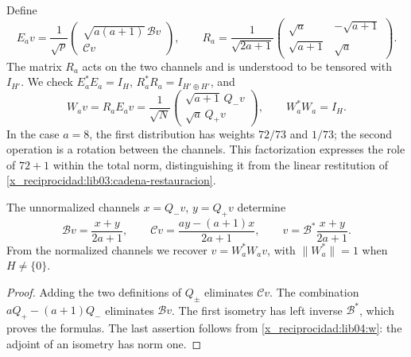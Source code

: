 Define
\begin{equation}
 E_av=\frac1{\sqrt p}
 \begin{pmatrix}\sqrt{a(a+1)}\,\mathcal Bv\\\mathcal Cv\end{pmatrix},
 \qquad
 R_a=\frac1{\sqrt{2a+1}}
 \begin{pmatrix}\sqrt a&-\sqrt{a+1}\\
                 \sqrt{a+1}&\sqrt a\end{pmatrix}.
 \label{x_reciprocidad:lib04:factorizacion-er}
\end{equation}
The matrix \(R_a\) acts on the two channels and is understood to be tensored
with \(I_{H'}\). We check
\(E_a^*E_a=I_H\), \(R_a^*R_a=I_{H'\oplus H'}\), and
\begin{equation}
 W_av=R_aE_av
 =\frac1{\sqrt N}
 \begin{pmatrix}\sqrt{a+1}\,Q_-v\\\sqrt a\,Q_+v\end{pmatrix},
 \qquad W_a^*W_a=I_H.
 \label{x_reciprocidad:lib04:w}
\end{equation}
In the case \(a=8\), the first distribution has weights \(72/73\) and
\(1/73\); the second operation is a rotation between the channels.
This factorization expresses the role of \(72+1\) within the total
norm, distinguishing it from the linear restitution of
\eqref{x_reciprocidad:lib03:cadena-restauracion}.

\begin{proposition}
\label{x_reciprocidad:lib04:prop-recuperacion}
The unnormalized channels \(x=Q_-v\), \(y=Q_+v\) determine
\begin{equation}
 \mathcal Bv=\frac{x+y}{2a+1},\qquad
 \mathcal Cv=\frac{ay-(a+1)x}{2a+1},\qquad
 v=\mathcal B^*\frac{x+y}{2a+1}.
 \label{x_reciprocidad:lib04:inversa-canales}
\end{equation}
From the normalized channels we recover
\(v=W_a^*W_av\), with \(\|W_a^*\|=1\) when \(H\neq\{0\}\).
\end{proposition}

\begin{proof}
Adding the two definitions of \(Q_\pm\) eliminates \(\mathcal Cv\).
The combination \(aQ_+-(a+1)Q_-\) eliminates \(\mathcal Bv\).
The first isometry has left inverse \(\mathcal B^*\), which
proves the formulas. The last assertion follows from
\eqref{x_reciprocidad:lib04:w}: the adjoint of an isometry has norm one.
\end{proof}

